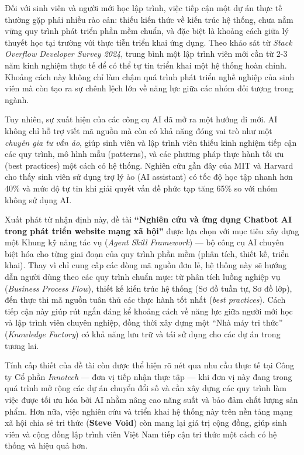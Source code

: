 \documentclass[13pt,a4paper,oneside]{extreport}
\numberwithin{equation}{chapter}
\numberwithin{figure}{chapter}
\numberwithin{table}{chapter}
\begin{document}
Đối với sinh viên và người mới học lập trình, việc tiếp cận một dự án thực tế thường gặp phải nhiều rào cản: thiếu kiến thức về kiến trúc hệ thống, chưa nắm vững quy trình phát triển phần mềm chuẩn, và đặc biệt là khoảng cách giữa lý thuyết học tại trường với thực tiễn triển khai ứng dụng. Theo khảo sát từ \textit{Stack Overflow Developer Survey 2024}, trung bình một lập trình viên mới cần từ 2-3 năm kinh nghiệm thực tế để có thể tự tin triển khai một hệ thống hoàn chỉnh. Khoảng cách này không chỉ làm chậm quá trình phát triển nghề nghiệp của sinh viên mà còn tạo ra sự chênh lệch lớn về năng lực giữa các nhóm đối tượng trong ngành.

Tuy nhiên, sự xuất hiện của các công cụ AI đã mở ra một hướng đi mới. AI không chỉ hỗ trợ viết mã nguồn mà còn có khả năng đóng vai trò như một \textit{chuyên gia tư vấn ảo}, giúp sinh viên và lập trình viên thiếu kinh nghiệm tiếp cận các quy trình, mô hình mẫu (patterns), và các phương pháp thực hành tối ưu (best practices) một cách có hệ thống. Nghiên cứu gần đây của MIT và Harvard cho thấy sinh viên sử dụng trợ lý ảo (AI assistant) có tốc độ học tập nhanh hơn 40\% và mức độ tự tin khi giải quyết vấn đề phức tạp tăng 65\% so với nhóm không sử dụng AI.

Xuất phát từ nhận định này, đề tài \textbf{“Nghiên cứu và ứng dụng Chatbot AI trong phát triển website mạng xã hội”} được lựa chọn với mục tiêu xây dựng một Khung kỹ năng tác vụ (\textit{Agent Skill Framework}) — bộ công cụ AI chuyên biệt hóa cho từng giai đoạn của quy trình phần mềm (phân tích, thiết kế, triển khai). Thay vì chỉ cung cấp các dòng mã nguồn đơn lẻ, hệ thống này sẽ hướng dẫn người dùng theo các quy trình chuẩn mực: từ phân tích luồng nghiệp vụ (\textit{Business Process Flow}), thiết kế kiến trúc hệ thống (Sơ đồ tuần tự, Sơ đồ lớp), đến thực thi mã nguồn tuân thủ các thực hành tốt nhất (\textit{best practices}). Cách tiếp cận này giúp rút ngắn đáng kể khoảng cách về năng lực giữa người mới học và lập trình viên chuyên nghiệp, đồng thời xây dựng một “Nhà máy tri thức” (\textit{Knowledge Factory}) có khả năng lưu trữ và tái sử dụng cho các dự án trong tương lai.

Tính cấp thiết của đề tài còn được thể hiện rõ nét qua nhu cầu thực tế tại Công ty Cổ phần \textit{Innotech} — đơn vị tiếp nhận thực tập — khi đơn vị này đang trong quá trình mở rộng các dự án chuyển đổi số và cần xây dựng các quy trình làm việc được tối ưu hóa bởi AI nhằm nâng cao năng suất và bảo đảm chất lượng sản phẩm. Hơn nữa, việc nghiên cứu và triển khai hệ thống này trên nền tảng mạng xã hội chia sẻ tri thức (\textbf{Steve Void}) còn mang lại giá trị cộng đồng, giúp sinh viên và cộng đồng lập trình viên Việt Nam tiếp cận tri thức một cách có hệ thống và hiệu quả hơn.
\end{document}
